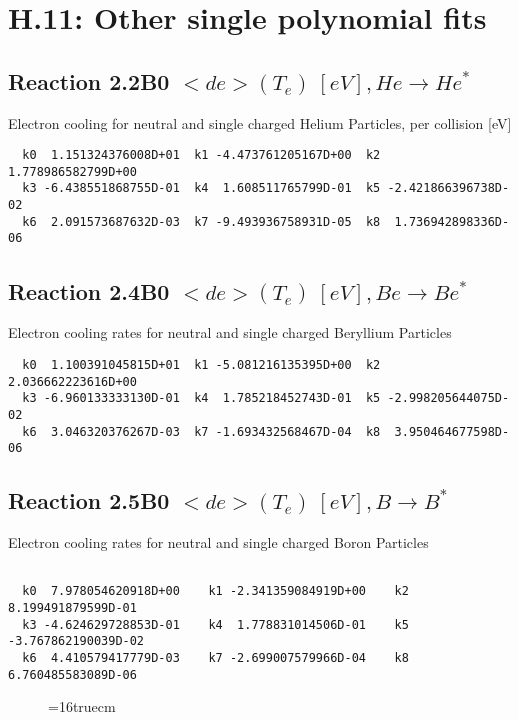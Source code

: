 \documentclass[12pt]{article}
\begin{document}
\section{H.11: Other single polynomial fits}

\subsection{
Reaction 2.2B0   $ <de>(T_e) \ [eV], He \rightarrow He^* $
}

  Electron cooling for neutral and single
  charged Helium Particles, per collision [eV]

\begin{small}\begin{verbatim}
  k0  1.151324376008D+01  k1 -4.473761205167D+00  k2  1.778986582799D+00
  k3 -6.438551868755D-01  k4  1.608511765799D-01  k5 -2.421866396738D-02
  k6  2.091573687632D-03  k7 -9.493936758931D-05  k8  1.736942898336D-06

\end{verbatim}\end{small}


\subsection{
Reaction 2.4B0  $  <de>(T_e)  \ [eV], Be \rightarrow Be^*$
}

  Electron cooling rates for neutral and single
  charged Beryllium Particles

\begin{small}\begin{verbatim}
  k0  1.100391045815D+01  k1 -5.081216135395D+00  k2  2.036662223616D+00
  k3 -6.960133333130D-01  k4  1.785218452743D-01  k5 -2.998205644075D-02
  k6  3.046320376267D-03  k7 -1.693432568467D-04  k8  3.950464677598D-06

\end{verbatim}\end{small}
\subsection{
Reaction 2.5B0   $ <de>(T_e) \ [eV], B \rightarrow B^* $
}

 Electron cooling rates for neutral and single
 charged Boron Particles

\begin{small}\begin{verbatim}

  k0  7.978054620918D+00    k1 -2.341359084919D+00    k2  8.199491879599D-01
  k3 -4.624629728853D-01    k4  1.778831014506D-01    k5 -3.767862190039D-02
  k6  4.410579417779D-03    k7 -2.699007579966D-04    k8  6.760485583089D-06

\end{verbatim}\end{small}
\begin{figure} \label{2.5ll}
\epsfxsize=16truecm
\end{figure}
\newpage
\end{document}
